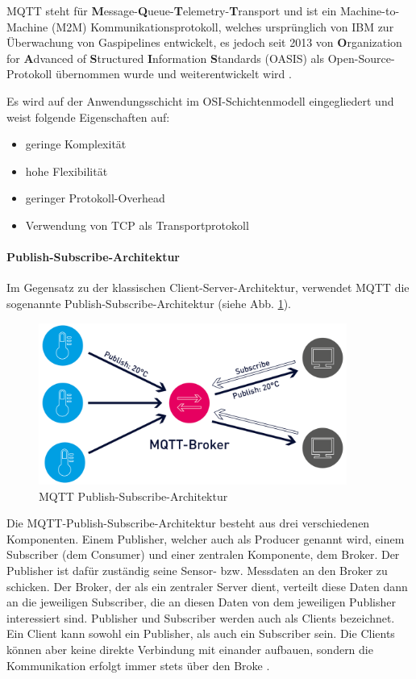 MQTT steht für \textbf{M}essage-\textbf{Q}ueue-\textbf{T}elemetry-\textbf{T}ransport und ist ein Machine-to-Machine (M2M) Kommunikationsprotokoll, welches ursprünglich von IBM zur Überwachung von Gaspipelines entwickelt, es jedoch seit 2013 von \textbf{O}rganization for \textbf{A}dvanced of \textbf{S}tructured \textbf{I}nformation \textbf{S}tandards (OASIS) als Open-Source-Protokoll übernommen wurde und weiterentwickelt wird \cite{Mangel2019}. 

Es wird auf der Anwendungsschicht im OSI-Schichtenmodell eingegliedert und weist folgende Eigenschaften auf:

\begin{itemize}
 \item geringe Komplexität 
 \item hohe Flexibilität 
 \item geringer Protokoll-Overhead 
 \item Verwendung von TCP als Transportprotokoll
\end{itemize}

\paragraph{Publish-Subscribe-Architektur}

Im Gegensatz zu der klassischen Client-Server-Architektur, verwendet MQTT die sogenannte Publish-Subscribe-Architektur (siehe Abb. \ref{fig:mqtt-architektur}).

\begin{figure}[h]
 \centering
 \includegraphics[width=0.9\textwidth]{pictures/mqtt-architecture}
 \caption[MQTT Publish-Subscribe-Architektur]{MQTT Publish-Subscribe-Architektur \cite{Mqtt2022}}
 \label{fig:mqtt-architektur}
\end{figure}

Die MQTT-Publish-Subscribe-Architektur besteht aus drei verschiedenen Komponenten. Einem Publisher, welcher auch als Producer genannt wird, einem Subscriber (dem Consumer) und einer zentralen Komponente, dem Broker. Der Publisher ist dafür zuständig seine Sensor- bzw. Messdaten an den Broker zu schicken. Der Broker, der als ein zentraler Server dient, verteilt diese Daten dann an die jeweiligen Subscriber, die an diesen Daten von dem jeweiligen Publisher interessiert sind. Publisher und Subscriber werden auch als Clients bezeichnet. Ein Client kann sowohl ein Publisher, als auch ein Subscriber sein. Die Clients können aber keine direkte Verbindung mit einander aufbauen, sondern die Kommunikation erfolgt immer stets über den Broke \cite{Mangel2019}. 

